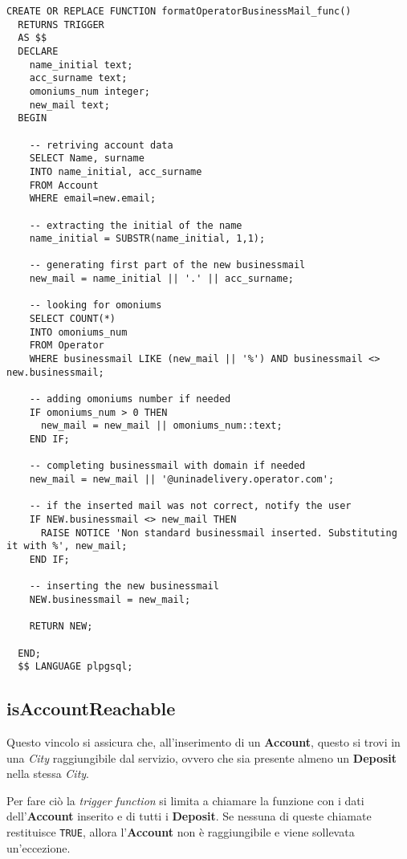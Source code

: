 \begin{lstlisting}[caption={Funzione per il vincolo \textbf{formatOperatorBusinessmail}}]
  CREATE OR REPLACE FUNCTION formatOperatorBusinessMail_func()
  RETURNS TRIGGER
  AS $$
  DECLARE
    name_initial text;
    acc_surname text;
    omoniums_num integer;
    new_mail text;
  BEGIN

    -- retriving account data
    SELECT Name, surname
    INTO name_initial, acc_surname
    FROM Account
    WHERE email=new.email;

    -- extracting the initial of the name
    name_initial = SUBSTR(name_initial, 1,1);

    -- generating first part of the new businessmail
    new_mail = name_initial || '.' || acc_surname;

    -- looking for omoniums
    SELECT COUNT(*)
    INTO omoniums_num
    FROM Operator
    WHERE businessmail LIKE (new_mail || '%') AND businessmail <> new.businessmail;

    -- adding omoniums number if needed
    IF omoniums_num > 0 THEN
      new_mail = new_mail || omoniums_num::text;
    END IF;

    -- completing businessmail with domain if needed
    new_mail = new_mail || '@uninadelivery.operator.com';

    -- if the inserted mail was not correct, notify the user
    IF NEW.businessmail <> new_mail THEN
      RAISE NOTICE 'Non standard businessmail inserted. Substituting it with %', new_mail;
    END IF;

    -- inserting the new businessmail
    NEW.businessmail = new_mail;

    RETURN NEW;

  END;
  $$ LANGUAGE plpgsql;
\end{lstlisting}

\subsection{\textbf{isAccountReachable}}

Questo vincolo si assicura che, all'inserimento di un \textbf{Account}, questo si trovi in una \textit{City} raggiungibile dal servizio, ovvero che sia presente almeno un \textbf{Deposit} nella stessa \textit{City}.

Per fare ciò la \textit{trigger function} si limita a chiamare la funzione  con i dati dell'\textbf{Account} inserito e di tutti i \textbf{Deposit}. Se nessuna di queste chiamate restituisce \lstinline{TRUE}, allora l'\textbf{Account} non è raggiungibile e viene sollevata un'eccezione.

